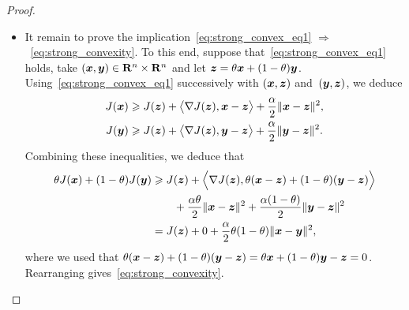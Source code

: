 \begin{proof}
\begin{itemize}
    \item
        It remain to prove the implication~\eqref{eq:strong_convex_eq1} $\Rightarrow$~\eqref{eq:strong_convexity}.
        To this end, suppose that~\eqref{eq:strong_convex_eq1} holds,
        take $(\vect x, \vect y) \in \real^n \times \real^n$
        and let $\vect z = \theta \vect x + (1 - \theta) \vect y$.
        Using~\eqref{eq:strong_convex_eq1} successively with $(\vect x, \vect z)$ and~$(\vect y, \vect z)$,
        we deduce
        \begin{align*}
            J(\vect x) &\geq J(\vect z) + \ip[\big]{\nabla J(\vect z), \vect x - \vect z} + \frac{\alpha}{2} \norm{\vect x - \vect z}^2, \\
            J(\vect y) &\geq J(\vect z) + \ip[\big]{\nabla J(\vect z), \vect y - \vect z} + \frac{\alpha}{2} \norm{\vect y - \vect z}^2.
        \end{align*}
        Combining these inequalities,
        we deduce that
        \begin{align*}
            \theta J(\vect x) + (1 - \theta) J(\vect y)
            &\geq J(\vect z) + \ip[\Big]{\nabla J(\vect z), \theta(\vect x - \vect z) + (1 - \theta) (\vect y - \vect z)} \\
            &\qquad + \frac{\alpha \theta}{2} \norm{\vect x - \vect z}^2 + \frac{\alpha(1 - \theta)}{2}  \norm{\vect y - \vect z}^2 \\
            &= J(\vect z) + 0 + \frac{\alpha}{2} \theta (1-\theta) \norm{\vect x - \vect y}^2,
        \end{align*}
        where we used that $\theta(\vect x - \vect z) + (1 - \theta) (\vect y - \vect z) = \theta \vect x + (1 - \theta) \vect y - \vect z = 0$.
        Rearranging gives~\eqref{eq:strong_convexity}.
    \end{itemize}
\end{proof}

